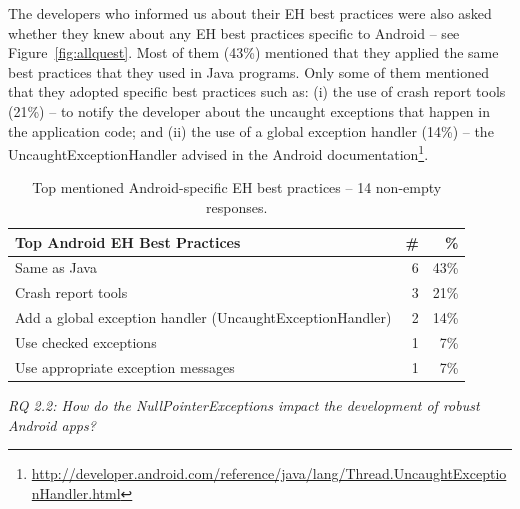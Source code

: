 The developers who informed us about their EH best practices were also asked whether they knew about any EH best practices specific to Android -- see Figure~\ref{fig:allquest}. Most of them (43\%) mentioned that they applied the same best practices that they used in Java programs. Only some of them mentioned that they adopted specific best practices such as: (i) the use of crash report tools (21\%) -- to notify the developer about the uncaught exceptions that happen in the application code; and (ii) the use of a global exception handler (14\%) -- the UncaughtExceptionHandler advised in the Android documentation\footnote{\url{http://developer.android.com/reference/java/lang/Thread.UncaughtExceptionHandler.html}}.
									
\begin{table}
\scriptsize
\centering
\begin{tabular}{lrr}
\hline
\bfseries{Top Android EH Best Practices } & \bfseries{\#} & \bfseries{\%} \\
\hline
Same as Java	& 6 &	43\% \\
Crash report tools	 & 3 &	21\% \\
Add a global exception handler (UncaughtExceptionHandler)	 & 2 & 14\% \\
Use checked exceptions	& 1 &	7\% \\
Use appropriate exception messages	& 1 &	7\% \\
\hline
\end{tabular}
\caption{Top mentioned Android-specific EH best practices -- 14 non-empty responses. }
\label{tab:androidpractices}
\end{table}			

\bigskip




\bigskip

\noindent\emph{RQ 2.2: How do the NullPointerExceptions impact the development of robust Android apps?}



